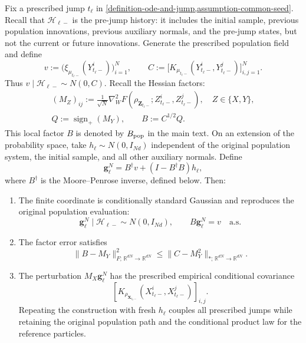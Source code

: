 \begin{lemma}
\label{lem:population-first-finite-coupling}
Fix a prescribed jump $t_\ell$ in
\cref{definition-ode-and-jump,assumption-common-seed}. Recall that
$\mathcal H_{\ell-}$ is the pre-jump history: it includes the initial
sample, previous population innovations, previous auxiliary normals, and
the pre-jump states, but not the current or future innovations.
Generate the prescribed population field and define
\[
 v:=\bigl(\xi_{\mu_{t_\ell-}}(Y_{t_\ell-}^i)\bigr)_{i=1}^N,
 \qquad
 C:=\bigl[K_{\mu_{t_\ell-}}(Y_{t_\ell-}^i,Y_{t_\ell-}^j)\bigr]_{i,j=1}^N.
\]
Thus $v\mid\mathcal H_{\ell-}\sim N(0,C)$. Recall the Hessian factors:
\[
\begin{gathered}
 (M_Z)_{ij}:=\frac1{\sqrt N}
 \nabla_W^2F(\rho_{\mathbf Z_{t_\ell-}};Z_{t_\ell-}^i,Z_{t_\ell-}^j),
 \quad Z\in\{X,Y\},\\
 Q:=\operatorname{sign}_+(M_Y),\qquad B:=C^{1/2}Q.
\end{gathered}
\]
This local factor \(B\) is denoted by \(B_{\rm pop}\) in the main text.
On an extension of the probability space, take $h_\ell\sim N(0,I_{Nd})$
independent of the original population system, the initial sample, and all
other auxiliary normals. Define
\[
\mathbf g_\ell^N=B^\dagger v+(I-B^\dagger B)h_\ell,
\]
where $B^\dagger$ is the Moore--Penrose inverse, defined below. Then:
\begin{enumerate}
\item The finite coordinate is conditionally standard Gaussian and
reproduces the original population evaluation:
\[
\mathbf g_\ell^N\mid\mathcal H_{\ell-}\sim N(0,I_{Nd}),\qquad
B\mathbf g_\ell^N=v\quad\text{a.s.}
\]
\item The factor error satisfies
\[
\|B-M_Y\|_{F;\,\mathbb R^{dN}\to\mathbb R^{dN}}^2\le\|C-M_Y^2\|_{*;\,\mathbb R^{dN}\to\mathbb R^{dN}}.
\]
\item The perturbation $M_X\mathbf g_\ell^N$ has the prescribed empirical
conditional covariance
\[
[K_{\rho_{\mathbf X_{t_\ell-}}}
(X_{t_\ell-}^i,X_{t_\ell-}^j)]_{i,j}.
\]
Repeating the construction with
fresh $h_\ell$ couples all prescribed jumps while retaining the original
population path and the conditional product law for the reference particles.
\end{enumerate}
\end{lemma}
